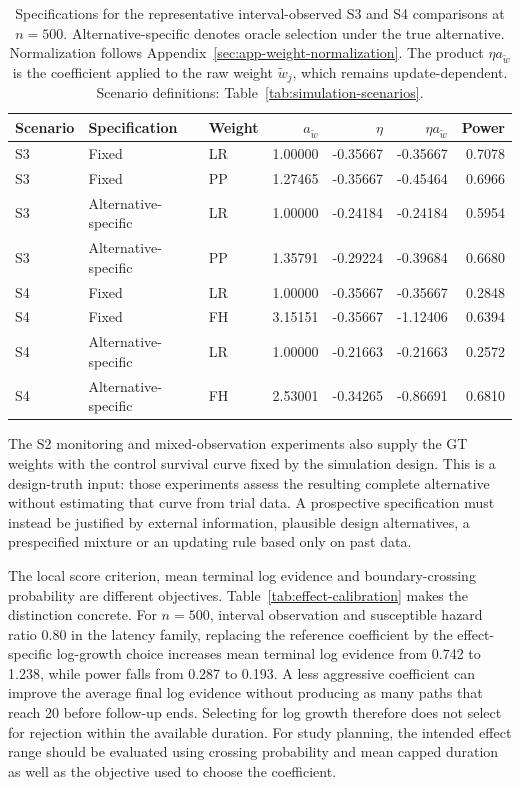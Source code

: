 \documentclass[12pt]{article}
\theoremstyle{definition}
\theoremstyle{remark}
\begin{document}
\begin{table}[H]
\centering
\footnotesize
\setlength{\tabcolsep}{3pt}
\caption{Specifications for the representative interval-observed S3 and S4 comparisons at $n=500$. Alternative-specific denotes oracle selection under the true alternative. Normalization follows Appendix~\ref{sec:app-weight-normalization}. The product $\eta a_{\widetilde w}$ is the coefficient applied to the raw weight $\widetilde w_j$, which remains update-dependent. Scenario definitions: Table~\ref{tab:simulation-scenarios}.}
\label{tab:representative-specifications}
\begin{tabular}{lllrrrr}
\toprule
Scenario & Specification & Weight & $a_{\widetilde w}$ & $\eta$ & $\eta a_{\widetilde w}$ & Power \\
\midrule
S3 & Fixed & LR & 1.00000 & -0.35667 & -0.35667 & 0.7078 \\
S3 & Fixed & PP & 1.27465 & -0.35667 & -0.45464 & 0.6966 \\
S3 & Alternative-specific & LR & 1.00000 & -0.24184 & -0.24184 & 0.5954 \\
S3 & Alternative-specific & PP & 1.35791 & -0.29224 & -0.39684 & 0.6680 \\
\midrule
S4 & Fixed & LR & 1.00000 & -0.35667 & -0.35667 & 0.2848 \\
S4 & Fixed & FH & 3.15151 & -0.35667 & -1.12406 & 0.6394 \\
S4 & Alternative-specific & LR & 1.00000 & -0.21663 & -0.21663 & 0.2572 \\
S4 & Alternative-specific & FH & 2.53001 & -0.34265 & -0.86691 & 0.6810 \\
\bottomrule
\end{tabular}
\end{table}

The S2 monitoring and mixed-observation experiments also supply the GT weights with the control survival curve fixed by the simulation design. This is a design-truth input: those experiments assess the resulting complete alternative without estimating that curve from trial data. A prospective specification must instead be justified by external information, plausible design alternatives, a prespecified mixture or an updating rule based only on past data.

The local score criterion, mean terminal log evidence and boundary-crossing probability are different objectives. Table~\ref{tab:effect-calibration} makes the distinction concrete. For $n=500$, interval observation and susceptible hazard ratio 0.80 in the latency family, replacing the reference coefficient by the effect-specific log-growth choice increases mean terminal log evidence from 0.742 to 1.238, while power falls from 0.287 to 0.193. A less aggressive coefficient can improve the average final log evidence without producing as many paths that reach 20 before follow-up ends. Selecting for log growth therefore does not select for rejection within the available duration. For study planning, the intended effect range should be evaluated using crossing probability and mean capped duration as well as the objective used to choose the coefficient.
\end{document}

